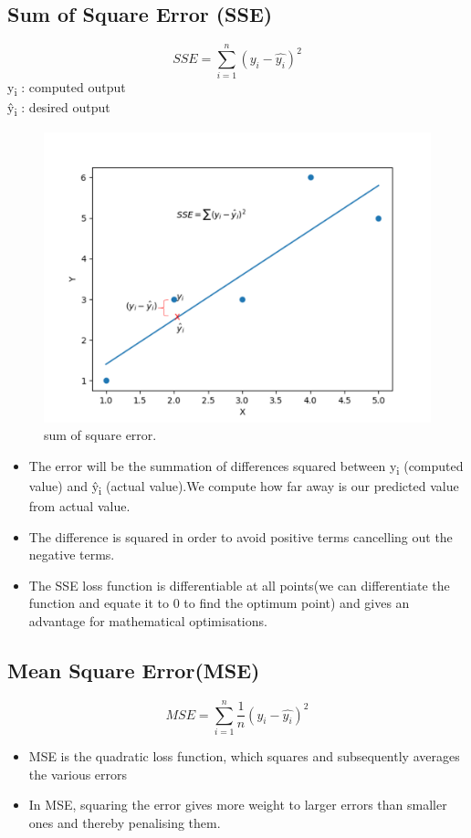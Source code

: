 \documentclass{resources/WeSTassignment}
\begin{document}
\subsection{Sum of Square Error (SSE)}
\[ SSE = \sum_{i=1}^{n} (y_i-\hat{y_i} )^2 \]
y\textsubscript{i} : computed output \\
\^y\textsubscript{i} : desired output
\begin{figure}[htbp]
\centerline{\includegraphics[scale=.5]{./resources/sse.png}}
\caption{sum of square error.}
\label{fig}
\end{figure}
\begin{itemize}
\item The error will be the summation of differences squared between y\textsubscript{i} (computed value) and \^y\textsubscript{i} (actual value).We compute how far away is our predicted value from actual value.
\item The difference is squared in order to avoid positive terms cancelling out the negative terms.
\item The SSE loss function is differentiable at all points(we can differentiate the function and equate it to 0 to find the optimum point) and gives an advantage for mathematical optimisations.
\end{itemize}
\subsection{Mean Square Error(MSE)}
\[ MSE = \sum_{i=1}^{n}\frac{1}{n} (y_i-\hat{y_i} )^2 \]
\begin{itemize}
	\item MSE is the quadratic loss function, which squares and subsequently
averages the various errors
	\item In MSE, squaring the error gives more weight to larger errors than smaller ones and thereby penalising them.
  
\end{itemize}
\end{document}
